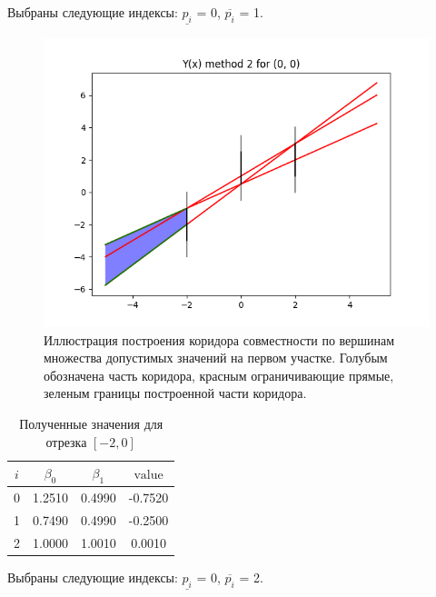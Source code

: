 Выбраны следующие индексы: $\underline{p_i}$ = 0, $\overline{p_i}$ = 1.

\begin{figure}[H]
    \centering
    \includegraphics[width=0.8\linewidth]{image/0_example.png}
    \caption{Иллюстрация построения коридора совместности по вершинам множества допустимых значений на первом участке. Голубым обозначена часть коридора, красным ограничивающие прямые, зеленым границы построенной части коридора.}
    \label{fig:my_label}
\end{figure}

\begin{table}[H]
    \centering
    \begin{tabular}{|c|c|c|c|}
        \hline
        $i$ & $\beta_0$ & $\beta_1$ & $\text{value}$ \\ \hline
        0 & 1.2510 & 0.4990 & -0.7520 \\ \hline
        1 & 0.7490 & 0.4990 & -0.2500 \\ \hline
        2 & 1.0000 & 1.0010 & 0.0010 \\ \hline
    \end{tabular}
    \caption{Полученные значения для отрезка $[-2, 0]$}
    \label{tab:my_label}
\end{table}

Выбраны следующие индексы: $\underline{p_i}$ = 0, $\overline{p_i}$ = 2.

